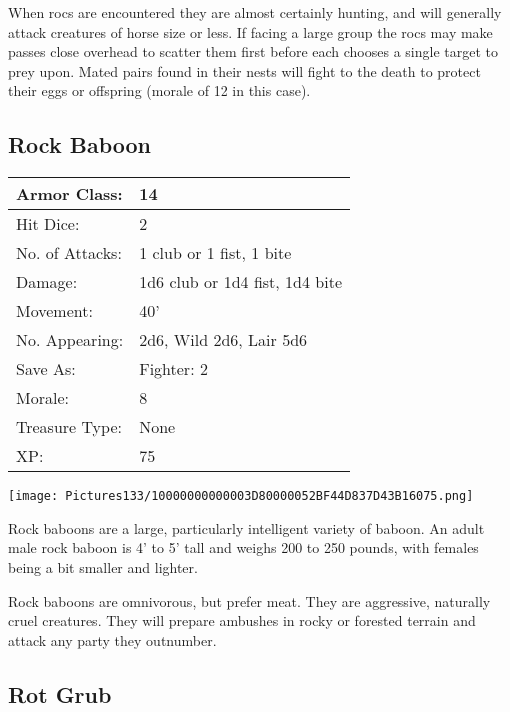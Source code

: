 \documentclass[a4paper,twoside,openany,10pt]{book}
\begin{document}
\begin{multicols}{2}
When rocs are encountered they are almost certainly hunting, and will generally attack creatures of horse size or less. If facing a large group the rocs may make passes close overhead to scatter them first before each chooses a single target to prey upon. Mated pairs found in their nests will fight to the death to protect their eggs or offspring (morale of 12 in this case). 


\subsection*{Rock Baboon}\label{rock-baboon}

\begin{tabularx}{0.50\textwidth}{@{}lX@{}}

Armor Class: & 14 \\\hline
Hit Dice: & 2 \\\hline
No. of Attacks: & 1 club or 1 fist, 1 bite \\\hline
Damage: & 1d6 club or 1d4 fist, 1d4 bite \\\hline
Movement: & 40' \\\hline
No. Appearing: & 2d6, Wild 2d6, Lair 5d6 \\\hline
Save As: & Fighter: 2 \\\hline
Morale: & 8 \\\hline
Treasure Type: & None \\\hline
XP: & 75 \\\hline
\end{tabularx}\medskip

\begin{center} \texttt{[image: Pictures133/10000000000003D80000052BF44D837D43B16075.png]} \end{center}

Rock baboons are a large, particularly intelligent variety of baboon. An adult male rock baboon is 4' to 5' tall and weighs 200 to 250 pounds, with females being a bit smaller and lighter.

Rock baboons are omnivorous, but prefer meat. They are aggressive, naturally cruel creatures. They will prepare ambushes in rocky or forested terrain and attack any party they outnumber.



\subsection*{Rot Grub}\label{rot-grub}


\end{multicols}
\end{document}
